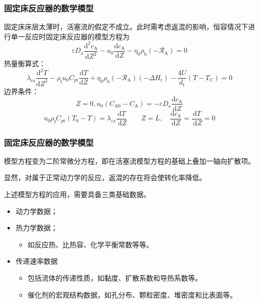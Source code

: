 \begin{frame}
    \frametitle{固定床反应器的数学模型}

    固定床床层太薄时，活塞流的假定不成立。此时需考虑返混的影响，恒容情况下进行单一反应时固定床反应器的模型方程为
    \[
        \varepsilon D_{\mathrm{a}} \frac{\mathrm{d}^{2} c_{\mathrm{A}}}{\mathrm{d} Z^{2}}-u_{0} \frac{\mathrm{d} c_{\mathrm{A}}}{\mathrm{d} Z}-\eta_{0} \rho_{\mathrm{b}}(-\mathscr{R}_{\mathrm{A}})=0 
    \]
    热量衡算式：
    \[
        \lambda_{\mathrm{ea}} \frac{\mathrm{d}^{2} T}{\mathrm{d} Z^{2}}-\rho_{\mathrm{f}} u_{0} C_{p \mathrm{t}} \frac{\mathrm{d} T}{\mathrm{d} Z}+\eta_{0} \rho_{\mathrm{b}}(-\mathscr{R}_{\mathrm{A}})(-\Delta H_{\mathrm{r}})-\frac{4 U}{d_{\mathrm{t}}}(T-T_{\mathrm{C}})=0
    \]
    边界条件：
    \[
        Z=0, u_{0}(C_{\mathrm{A} 0}-C_{\mathrm{A}})=-\varepsilon D_{\mathrm{a}} \frac{\mathrm{d} c_{\mathrm{A}}}{\mathrm{d} Z}
    \]
    \[
        u_{0} \rho_{\mathrm{f}} C_{p \mathrm{t}}(T_{0}-T)=\lambda_{\varepsilon \mathrm{a}} \frac{\mathrm{d} T}{\mathrm{~d} Z} \qquad Z=L, \quad \frac{\mathrm{d} c_{\mathrm{A}}}{\mathrm{d} Z}=\frac{\mathrm{d} T}{\mathrm{~d} Z}=0
    \]

\end{frame}


\begin{frame}
    \frametitle{固定床反应器的数学模型}

    模型方程变为二阶常微分方程，即在活塞流模型方程的基础上叠加一轴向扩散项。
    
    显然，对属于正常动力学的反应，返混的存在将会使转化率降低。

    上述模型方程的应用，需要具备三类基础数据。
    \begin{itemize}
        \item 动力学数据；
        \item 热力学数据；
            \begin{itemize}
                \item 如反应热、比热容、化学平衡常数等等。
            \end{itemize}
        \item 传递速率数据
            \begin{itemize}
                \item 包括流体的传递性质，如黏度、扩散系数和导热系数等。
                \item 催化剂的宏观结构数据，如孔分布、颗粒密度、堆密度和比表面等。
            \end{itemize}
    \end{itemize}

\end{frame}